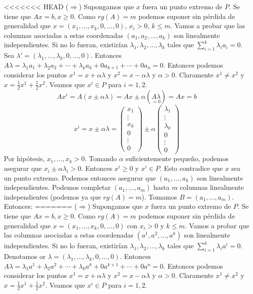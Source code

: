 \documentclass[PM.tex]{subfiles}
\begin{document}
\begin{dem}
<<<<<<< HEAD
($\Rightarrow$) Supongamos que $x$ fuera un punto extremo de $P$. Se tiene que $Ax=b, x ≥ 0$. Como $rg(A) = m$ podemos suponer sin pérdida de generalidad que $x =(x_1,\dots,x_k,0,\dots,0)$, $x_i > 0$, $k ≤ m$.
Vamos a probar que las columnas asociadas a estas coordenadas $(a_1, a_2, \dots, a_k)$ son linealmente independientes. Si no lo fueran, existirían $λ_1,λ_2, \dots, λ_k$ tales que $\sum_{i=1}^k λ_i a_i = 0$. Sea $λ' =(λ_1,\dots,λ_k,0,\dots,0)$. Entonces $Aλ=λ_1a_1 + λ_2a_2 + \cdots + λ_ka_k + 0a_{k+1}+\cdots+0a_n = 0$. Entonces podemos considerar los puntos $x^1 = x+αλ$ y $x^2 = x-αλ$ y $α > 0$. Claramente $x^1 \neq x^2$ y $x = \frac{1}{2}x^1+ \frac{1}{2}x^2$. Veamos que $x^i \in P$ para $i=1,2$.
\[ Ax^i = A(x \pm αλ) = Ax \pm α(\underset{=0}{Aλ}) = Ax = b \]
\[ x^i = x \pm αλ = \begin{pmatrix}x_1\\\vdots\\x_k\\0\\\vdots\\0\end{pmatrix} \pm α \begin{pmatrix}λ_1\\\vdots\\λ_k\\0\\\vdots\\0\end{pmatrix} \]
Por hipótesis, $x_1,\dots,x_k > 0$. Tomando $α$ suficientemente pequeño, podemos asegurar que $x_i \pm αλ_i > 0$. Entonces $x^i \geq 0$ y $x^i \in P$. Esto contradice que $x$ sea un punto extremo. Podemos entonces asegurar que $(a_1,\dots,a_k)$ son linealmente independientes. Podemos completar $(a_1,\dots,a_m)$ hasta $m$ columnas linealmente independientes (podemos ya que $rg(A) = m$). Tomamos $B = (a_1,\dots,a_m)$. Entonces:
=======
($\Rightarrow$) Supongamos que $x$ fuera un punto extremo de $P$. Se tiene que $Ax=b, x ≥ 0$. Como $rg(A) = m$ podemos suponer sin pérdida de generalidad que $x =(x_1,\dots,x_k,0,\dots,0)$ con $x_i > 0$ y $k ≤ m$.
Vamos a probar que las columnas asociadas a estas coordenadas $(a^1, a^2, \dots, a^k)$ son linealmente independientes. Si no lo fueran, existirían $λ_1,λ_2, \dots, λ_k$ tales que $\sum_{i=1}^k λ_i a^i = 0$. Denotamos or $λ =(λ_1,\dots,λ_k,0,\dots,0)$. Entonces $Aλ=λ_1a^1 + λ_2a^2 + \cdots + λ_ka^k + 0a^{k+1}+\cdots+0a^n = 0$. Entonces podemos considerar los puntos $x^1 = x+αλ$ y $x^2 = x-αλ$ y $α > 0$. Claramente $x^1 \neq x^2$ y $x = \frac{1}{2}x^1+ \frac{1}{2}x^2$. Veamos que $x^i \in P$ para $i=1,2$.

\end{dem}
\end{document}

